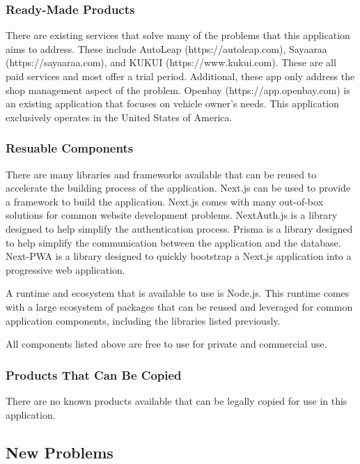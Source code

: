 \documentclass[12pt]{article}
\begin{document}
\subsubsection{Ready-Made Products}

There are existing services that solve many of the problems that this application aims to address.
These include AutoLeap (https://autoleap.com), Sayaaraa (https://sayaaraa.com), and KUKUI
(https://www.kukui.com). These are all paid services and most offer a trial period. Additional,
these app only address the shop management aspect of the problem. Openbay (https://app.openbay.com)
is an existing application that focuses on vehicle owner's needs. This application exclusively
operates in the United States of America.

\subsubsection{Resuable Components}

There are many libraries and frameworks available that can be reused to accelerate the building
process of the application. Next.js can be used to provide a framework to build the application.
Next.js comes with many out-of-box solutions for common website development problems. NextAuth.js
is a library designed to help simplify the authentication process. Prisma is a library designed to
help simplify the communication between the application and the database. Next-PWA is a library
designed to quickly bootstrap a Next.js application into a progressive web application.

A runtime and ecosystem that is available to use is Node.js. This runtime comes with a large
ecosystem of packages that can be reused and leveraged for common application components, including
the libraries listed previously.

All components listed above are free to use for private and commercial use.

\subsubsection{Products That Can Be Copied}

There are no known products available that can be legally copied for use in this application.

\subsection{New Problems}
\end{document}
